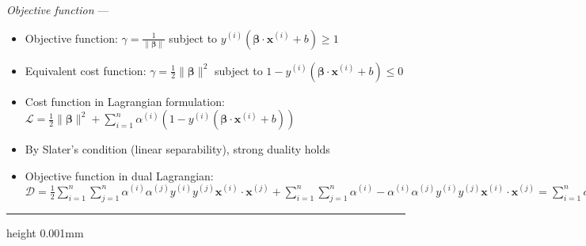 \emph{Objective function} --- 
\begin{itemize}
    \item Objective function: $\gamma = \frac{1}{\| \boldsymbol{\beta} \|} $ subject to $y^{(i)} (\boldsymbol{\beta} \cdot \boldsymbol{x}^{(i)} + b) \geq 1$
    \item Equivalent cost function: $\gamma = \frac{1}{2} \| \boldsymbol{\beta} \|^2 $ subject to $1 - y^{(i)} (\boldsymbol{\beta} \cdot \boldsymbol{x}^{(i)} + b) \leq 0$
    \item Cost function in Lagrangian formulation: $\mathcal{L} = \frac{1}{2} \| \boldsymbol{\beta} \|^2 + \sum_{i=1}^n \alpha^{(i)} (1 - y^{(i)} (\boldsymbol{\beta} \cdot \boldsymbol{x}^{(i)} + b))$
    \item By Slater's condition (linear separability), strong duality holds
    \item Objective function in dual Lagrangian: $\mathcal{D} = \frac{1}{2}  \sum_{i=1}^n  \sum_{j=1}^n \alpha^{(i)}\alpha^{(j)} y^{(i)}y^{(j)} \boldsymbol{x}^{(i)} \cdot \boldsymbol{x}^{(j)} + \sum_{i=1}^n  \sum_{j=1}^n \alpha^{(i)} - \alpha^{(i)}\alpha^{(j)} y^{(i)}y^{(j)} \boldsymbol{x}^{(i)} \cdot \boldsymbol{x}^{(j)} = \sum_{i=1}^n \alpha^{(i)} - \frac{1}{2}  \sum_{i=1}^n  \sum_{j=1}^n \alpha^{(i)}\alpha^{(j)} y^{(i)}y^{(j)} \boldsymbol{x}^{(i)} \cdot \boldsymbol{x}^{(j)}$
\end{itemize}

{\color{lightgray}\hrule height 0.001mm}

